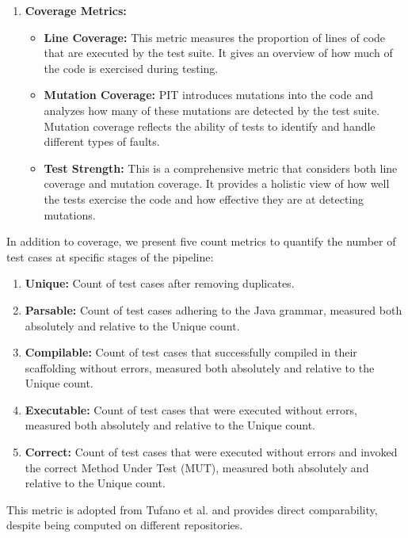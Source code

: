     \begin{enumerate}
        \item \textbf{Coverage Metrics:}
        \begin{itemize}
            \item \textbf{Line Coverage:} This metric measures the proportion of lines of code that are executed by the test suite. It gives an overview of how much of the code is exercised during testing.
            \item \textbf{Mutation Coverage:} PIT introduces mutations into the code and analyzes how many of these mutations are detected by the test suite. Mutation coverage reflects the ability of tests to identify and handle different types of faults.
            \item \textbf{Test Strength:} This is a comprehensive metric that considers both line coverage and mutation coverage. It provides a holistic view of how well the tests exercise the code and how effective they are at detecting mutations.
        \end{itemize}
    \end{enumerate}

    In addition to coverage, we present five count metrics to quantify the number of test cases at specific stages of the pipeline:

    \begin{enumerate}
        \item \textbf{Unique:} Count of test cases after removing duplicates.
        \item \textbf{Parsable:} Count of test cases adhering to the Java grammar, measured both absolutely and relative to the Unique count.
        \item \textbf{Compilable:} Count of test cases that successfully compiled in their scaffolding without errors, measured both absolutely and relative to the Unique count.
        \item \textbf{Executable:} Count of test cases that were executed without errors, measured both absolutely and relative to the Unique count.
        \item \textbf{Correct:} Count of test cases that were executed without errors and invoked the correct Method Under Test (MUT), measured both absolutely and relative to the Unique count. 
    \end{enumerate}
    This metric is adopted from Tufano et al. \cite{tufano_unit_2021} and provides direct comparability, despite being computed on different repositories.

